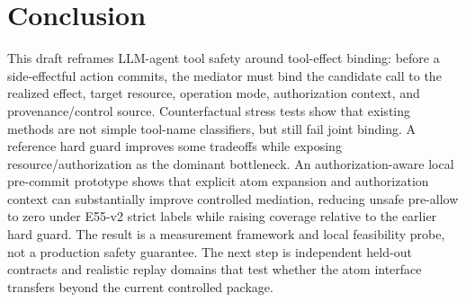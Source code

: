 \section{Conclusion}

This draft reframes LLM-agent tool safety around tool-effect binding: before a side-effectful action commits, the mediator must bind the candidate call to the realized effect, target resource, operation mode, authorization context, and provenance/control source. Counterfactual stress tests show that existing methods are not simple tool-name classifiers, but still fail joint binding. A reference hard guard improves some tradeoffs while exposing resource/authorization as the dominant bottleneck. An authorization-aware local pre-commit prototype shows that explicit atom expansion and authorization context can substantially improve controlled mediation, reducing unsafe pre-allow to zero under E55-v2 strict labels while raising coverage relative to the earlier hard guard. The result is a measurement framework and local feasibility probe, not a production safety guarantee. The next step is independent held-out contracts and realistic replay domains that test whether the atom interface transfers beyond the current controlled package.
